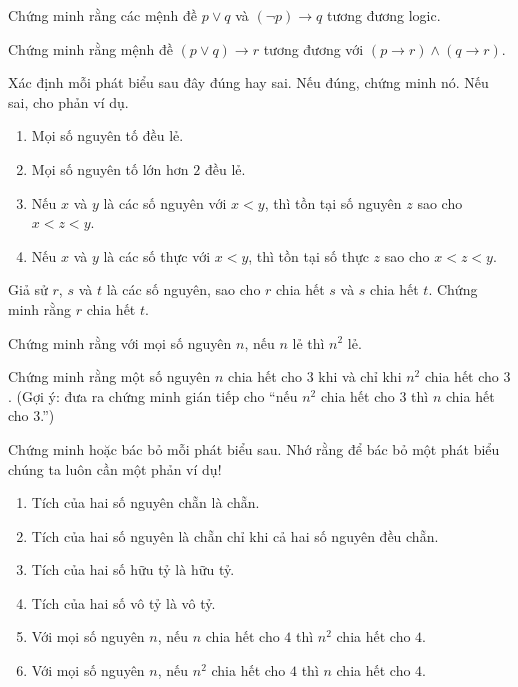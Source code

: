 \begin{exercise}
Chứng minh rằng các mệnh đề $p \vee q$ và $(\neg p) \to q$ tương đương logic.
\end{exercise}

\begin{exercise}
Chứng minh rằng mệnh đề $(p \vee q) \to r$ tương đương với $(p \to r) \wedge (q \to r)$.
\end{exercise}

\begin{exercise}
Xác định mỗi phát biểu sau đây đúng hay sai. Nếu đúng, chứng minh nó. Nếu sai, cho phản ví dụ.
\begin{enumerate}[label=\alph*)]
\item Mọi số nguyên tố đều lẻ.
\item Mọi số nguyên tố lớn hơn $2$ đều lẻ.
\item Nếu $x$ và $y$ là các số nguyên với $x < y$, thì tồn tại số nguyên $z$ sao cho $x < z < y$.
\item Nếu $x$ và $y$ là các số thực với $x < y$, thì tồn tại số thực $z$ sao cho $x < z < y$.
\end{enumerate}
\end{exercise}

\begin{exercise}
Giả sử $r$, $s$ và $t$ là các số nguyên, sao cho $r$ chia hết $s$ và $s$ chia hết $t$. Chứng minh rằng $r$ chia hết $t$.
\end{exercise}

\begin{exercise}
Chứng minh rằng với mọi số nguyên $n$, nếu $n$ lẻ thì $n^2$ lẻ.
\end{exercise}

\begin{exercise}
Chứng minh rằng một số nguyên $n$ chia hết cho $3$ khi và chỉ khi $n^2$ chia hết cho $3$. (Gợi ý: đưa ra chứng minh gián tiếp cho ``nếu $n^2$ chia hết cho $3$ thì $n$ chia hết cho $3$.'')
\end{exercise}

\begin{exercise}
Chứng minh hoặc bác bỏ mỗi phát biểu sau. Nhớ rằng để bác bỏ một phát biểu chúng ta luôn cần một phản ví dụ!
\begin{enumerate}[label=\alph*)]
\item Tích của hai số nguyên chẵn là chẵn.
\item Tích của hai số nguyên là chẵn chỉ khi cả hai số nguyên đều chẵn.
\item Tích của hai số hữu tỷ là hữu tỷ.
\item Tích của hai số vô tỷ là vô tỷ.
\item Với mọi số nguyên $n$, nếu $n$ chia hết cho $4$ thì $n^2$ chia hết cho $4$.
\item Với mọi số nguyên $n$, nếu $n^2$ chia hết cho $4$ thì $n$ chia hết cho $4$.
\end{enumerate}
\end{exercise}

